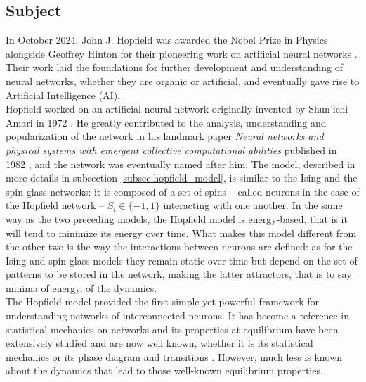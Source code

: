 \subsection{Subject}
\myindent  In October 2024, John J. Hopfield was awarded the Nobel Prize in Physics alongside Geoffrey Hinton for their
pioneering work on artificial neural networks \cite{nobel2024physics}. Their work laid the foundations for further development and understanding of neural networks, whether they are organic or artificial, and eventually gave rise to Artificial Intelligence (AI).\\
Hopfield worked on an artificial neural network originally invented by Shun'ichi Amari in 1972 \cite{Amari1972LearningPA}. He greatly contributed to the analysis, understanding and popularization of the network in his landmark paper \textit{Neural networks and physical systems with emergent collective computational abilities} published in 1982 \cite{Hopfield1982}, and the network was eventually named after him. The model, described in more details in subsection \ref{subsec:hopfield_model}, is similar to the Ising and the spin glass networks: it is composed of a set of spins -- called neurons in the case of the Hopfield network -- $S_i \in \{-1, 1\}$ interacting with one another. In the same way as the two preceding models, the Hopfield model is energy-based, that is it will tend to minimize its energy over time. What makes this model different from the other two is the way the interactions between neurons are defined: as for the Ising and spin glass models they remain static over time but depend on the set of patterns to be stored in the network, making the latter attractors, that is to say minima of energy, of the dynamics. \\
The Hopfield model provided the first simple yet powerful framework for understanding networks of interconnected neurons. It has become a reference in statistical mechanics on networks and its properties at equilibrium have been extensively studied and are now well known, whether it is its statistical mechanics \cite{Amit1985,AMIT1987,Amit1989,Sompolinsky1988} or its phase diagram and transitions \cite{Hertz1991}. However, much less is known about the dynamics that lead to those well-known equilibrium properties.

